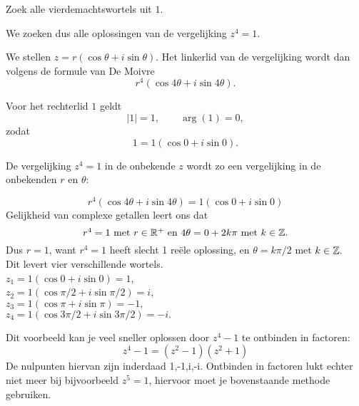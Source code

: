 \documentclass{ximera}
\begin{document}
\begin{example}
    Zoek alle vierdemachtswortels uit $1$.
    \begin{oplossing}
    We zoeken dus alle oplossingen van de vergelijking $z^4=1.$
     
    We stellen $z = r(\cos\theta+i\sin\theta)$.
    Het linkerlid van de vergelijking wordt dan volgens de formule van De Moivre $$r^4(\cos 4\theta+i\sin 4\theta).$$
     
    Voor het rechterlid $1$ geldt
    \[ |1| = 1, \qquad \arg (1) = 0, \]
    zodat
    \[ 1 = 1(\cos 0+i\sin 0). \]
     
    De
    vergelijking $z^4=1$ in de onbekende $z$ wordt zo een vergelijking in de onbekenden $r$ en $\theta$:
     
    $$r^4(\cos 4\theta+i\sin 4\theta) =1(\cos 0+i\sin 0)$$
    Gelijkheid van complexe getallen leert ons dat $$\mbox{$r^4=1$ met $r\in \mathbb{R}^+$ en
        $4\theta
        =0+2k\pi$ met $k\in \mathbb{Z}.$}$$ Dus $r=1$, want $r^4=1$ heeft slecht 1 reële oplossing, en $\theta=k\pi/2$ met $k\in
    \mathbb{Z}.$
    \\Dit levert vier verschillende wortels.
    \\$z_1=1(\cos 0+i\sin 0)=1$,
    \\$z_2=1(\cos \pi/2+i\sin \pi/2) =i$,
    \\$z_3=1 (\cos \pi+i\sin \pi) =-1,$
    \\$z_4=1 (\cos 3\pi/2+i\sin 3\pi/2)=-i.$
     
     
    Dit voorbeeld kan je veel sneller oplossen door $z^4-1$ te ontbinden in factoren:
    $$ z^4-1=(z^2-1)(z^2+1)$$
    De nulpunten hiervan zijn inderdaad 1,-1,i,-i. Ontbinden in factoren lukt echter niet meer bij bijvoorbeeld $z^5=1$, hiervoor moet je bovenstaande methode gebruiken.
    \end{oplossing}
    \end{example}
 
\end{document}
